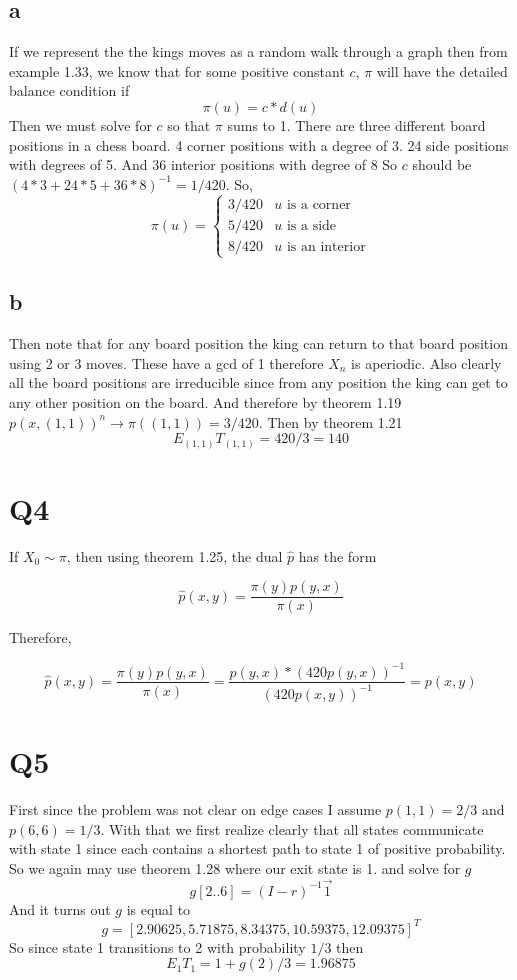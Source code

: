 \documentclass{article}
\begin{document}
\subsection*{a}
If we represent the the kings moves as a random walk through a graph then from example 1.33, we know that for some positive constant $c$, $\pi$ will have the detailed balance condition if 
\[
\pi(u) = c*d(u)
\]
Then we must solve for $c$ so that $\pi$ sums to 1. There are three different board positions in a chess board. 
4 corner positions with a degree of 3. 24 side positions with degrees of 5. And 36 interior positions with degree of 8
So $c$ should be $(4*3 + 24*5 + 36*8)^{-1} = 1/420$.
So,
\[
\pi(u) = \begin{cases} 
3/420 & u \text{ is a corner}\\
5/420 & u \text{ is a side}\\
8/420 & u \text{ is  an interior}
\end{cases}
\]

\subsection*{b}
Then note that for any board position the king can return to that board position using 2 or 3 moves. These have a gcd of 1 therefore $X_n$ is aperiodic. Also clearly all the board positions are irreducible since from any position the king can get to any other position on the board. And therefore by theorem 1.19 
$p(x, (1,1))^n \rightarrow \pi((1,1)) = 3/420$. 
Then by theorem 1.21 
\[
E_{(1,1)} T_{(1,1)} = 420/3 = 140
\]

\section*{Q4}

If $X_0 \sim \pi$, then using theorem 1.25, the dual $\hat{p}$ has the form

\[
\hat{p}(x,y) = \frac{\pi(y)p(y,x)}{\pi(x)}
\]

Therefore,

\[
\hat{p}(x,y) = \frac{\pi(y)p(y,x)}{\pi(x)} = \frac{p(y,x)*(420p(y,x))^{-1}}{(420p(x,y))^{-1}} = p(x,y)
\]

\section*{Q5}
First since the problem was not clear on edge cases I assume $p(1,1) = 2/3$ and $p(6,6) = 1/3$. With that we first realize clearly that all states communicate with state 1 since each contains a shortest path to state 1 of positive probability. 
So we again may use theorem 1.28 where our exit state is 1. 
and solve for $g$
\[
g[2 .. 6] = (I - r)^{-1} \vec{1}
\]
And it turns out $g$ is equal to 
\[
g = [  2.90625,   5.71875,   8.34375,  10.59375,  12.09375]^T
\]
So since state 1 transitions to 2 with probability $1/3$ then
\[
E_1T_1 = 1 + g(2)/3 = 1.96875
\]
\end{document}
